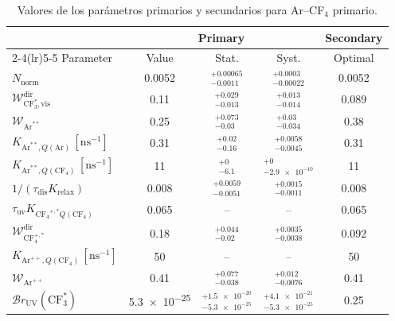 \begin{table}[htbp]
\centering
\caption{Valores de los parámetros primarios y secundarios para Ar--CF$_4$ primario.}
\label{tab:ArCF4_primary_param_secondary}
\begin{tabular}{lcccc}
\toprule
 & \multicolumn{3}{c}{Primary} & \multicolumn{1}{c}{Secondary} \\
\cmidrule(lr){2-4}\cmidrule(lr){5-5}
Parameter & Value & Stat. & Syst. & Optimal \\
\midrule
$N_{\mathrm{norm}}$ & \num{0.0052} & $^{+\num{0.00065}}_{-\num{0.0011}}$ & $^{+\num{0.0003}}_{-\num{0.00022}}$ & \num{0.0052} \\
$\mathcal{W}_{\mathrm{CF}_3^*,\mathrm{vis}}^{\mathrm{dir}}$ & \num{0.11} & $^{+\num{0.029}}_{-\num{0.013}}$ & $^{+\num{0.013}}_{-\num{0.014}}$ & \num{0.089} \\
$\mathcal{W}_{\mathrm{Ar}^{**}}$ & \num{0.25} & $^{+\num{0.073}}_{-\num{0.03}}$ & $^{+\num{0.03}}_{-\num{0.034}}$ & \num{0.38} \\
$K_{\mathrm{Ar}^{**},Q(\mathrm{Ar})}\,[\mathrm{ns}^{-1}]$ & \num{0.31} & $^{+\num{0.02}}_{-\num{0.16}}$ & $^{+\num{0.0058}}_{-\num{0.0045}}$ & \num{0.31} \\
$K_{\mathrm{Ar}^{**},Q(\mathrm{CF}_4)}\,[\mathrm{ns}^{-1}]$ & \num{11} & $^{+\num{0}}_{-\num{6.1}}$ & $^{+\num{0}}_{-\num{2.9e-10}}$ & \num{11} \\
$1/(\tau_{\mathrm{dis}}K_{\mathrm{relax}})$ & \num{0.008} & $^{+\num{0.0059}}_{-\num{0.0051}}$ & $^{+\num{0.0015}}_{-\num{0.0011}}$ & \num{0.008} \\
$\tau_{\mathrm{uv}}K_{\mathrm{CF_4}^{+,*}Q(\mathrm{CF}_4)}$ & \num{0.065} & -- & -- & \num{0.065} \\
$\mathcal{W}_{\mathrm{CF}_4^{+,*}}^{\mathrm{dir}}$ & \num{0.18} & $^{+\num{0.044}}_{-\num{0.02}}$ & $^{+\num{0.0035}}_{-\num{0.0038}}$ & \num{0.092} \\
$K_{\mathrm{Ar}^{++},Q(\mathrm{CF}_4)}\,[\mathrm{ns}^{-1}]$ & \num{50} & -- & -- & \num{50} \\
$\mathcal{W}_{\mathrm{Ar}^{++}}$ & \num{0.41} & $^{+\num{0.077}}_{-\num{0.038}}$ & $^{+\num{0.012}}_{-\num{0.0076}}$ & \num{0.41} \\
$\mathcal{B}r_{\mathrm{UV}}(\mathrm{CF}_3^*)$ & \num{5.3e-25} & $^{+\num{1.5e-20}}_{-\num{5.3e-25}}$ & $^{+\num{4.1e-21}}_{-\num{5.3e-25}}$ & \num{0.25} \\
\bottomrule
\end{tabular}
\end{table}
